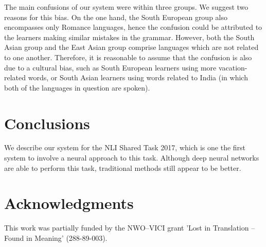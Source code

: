 \documentclass[11pt,letterpaper]{article}
\begin{document}
The main confusions of our system were within three groups.
We suggest two reasons for this bias.
On the one hand, the South European group also encompasses only Romance languages, hence the confusion could be attributed to the learners making similar mistakes in the grammar.
However, both the South Asian group and the East Asian group comprise languages which are not related to one another.
Therefore, it is reasonable to assume that the confusion is also due to a cultural bias, such as South European learners using more vacation-related words, or South Asian learners using words related to India (in which both of the languages in question are spoken).

\section{Conclusions}
We describe our system for the NLI Shared Task 2017, which is one the first system to involve a neural approach to this task.
Although deep neural networks are able to perform this task, traditional methods still appear to be better.

\section*{Acknowledgments}
This work was partially funded by the NWO--VICI grant 'Lost in Translation – Found in Meaning' (288-89-003).




\end{document}
